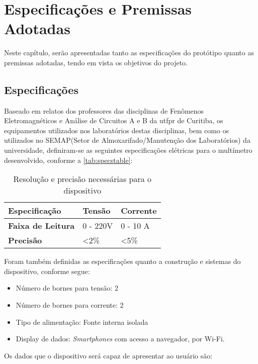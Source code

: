 \chapter{Especificações e Premissas Adotadas}\label{cap:especificacoes}

Neste capítulo, serão apresentadas tanto as especificações do protótipo quanto as premissas adotadas, tendo em vista os objetivos do projeto.

\section{Especificações}\label{spec}
Baseado em relatos dos professores das disciplinas de Fenômenos Eletromagnéticos e Análise de Circuitos A e B da \gls{utfpr} de Curitiba, os equipamentos utilizados nos laboratórios destas disciplinas, bem como os utilizados no \gls{SEMAP}(Setor de Almoxarifado/Manutenção dos Laboratórios) da universidade, definiram-se as seguintes especificações elétricas para o multímetro desenvolvido, conforme a \autoref{tab:specstable}:

\begin{table}[!ht]
    \centering
    \caption{Resolução e precisão necessárias para o dispositivo}
    \label{tab:specstable}
    \begin{tabular}{ l l l }
        \hline
        \textbf{Especificação}    & \textbf{Tensão} & \textbf{Corrente} \\ \hline
        \textbf{Faixa de Leitura} & 0 - 220V        & 0 - 10 A          \\ 
        \textbf{Precisão}         & <2\%            & <5\%              \\ \hline
    \end{tabular}
    \fonte{}
\end{table}

Foram também definidas as especificações quanto a construção e sistemas do dispositivo, conforme segue:

\begin{itemize}
    \item Número de bornes para tensão: 2
    \item Número de bornes para corrente: 2
    \item Tipo de alimentação: Fonte interna isolada
    \item Display de dados: \textit{Smartphones} com acesso a navegador, por Wi-Fi.
\end{itemize}

Os dados que o dispositivo será capaz de apresentar ao usuário são:

